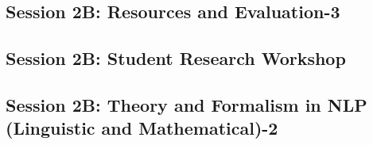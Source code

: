 \subsection{\large Session 2B: Resources and Evaluation-3}
\label{parallel-session-2B-trackH}
\TrackHLoc\hfill\sessionchair{}{}
\clearpage
\subsection{\large Session 2B: Student Research Workshop}
\label{parallel-session-2B-trackI}
\TrackILoc\hfill\sessionchair{}{}
\clearpage
\subsection{\large Session 2B: Theory and Formalism in NLP (Linguistic and Mathematical)-2}
\label{parallel-session-2B-trackJ}
\TrackJLoc\hfill\sessionchair{}{}
\clearpage


